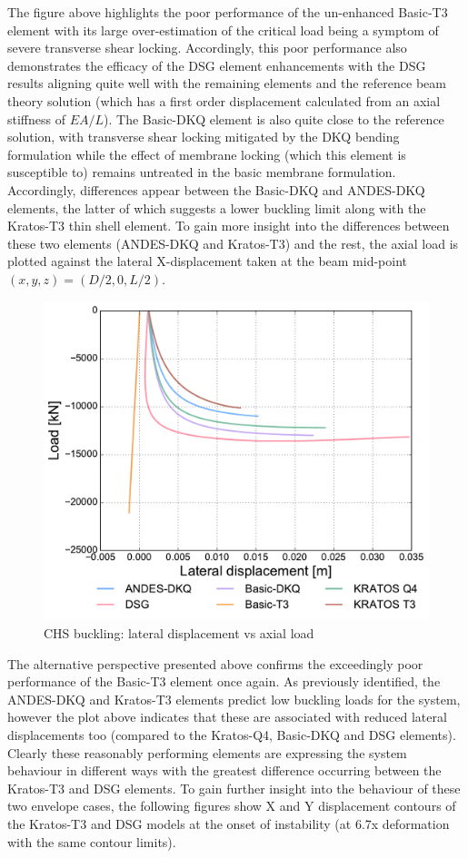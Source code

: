The figure above highlights the poor performance of the un-enhanced Basic-T3 element with its large over-estimation of the critical load being a symptom of severe transverse shear locking. Accordingly, this poor performance also demonstrates the efficacy of the DSG element enhancements with the DSG results aligning quite well with the remaining elements and the reference beam theory solution (which has a first order displacement calculated from an axial stiffness of $EA/L$). The Basic-DKQ element is also quite close to the reference solution, with transverse shear locking mitigated by the DKQ bending formulation while the effect of membrane locking (which this element is susceptible to) remains untreated in the basic membrane formulation. Accordingly, differences appear between the Basic-DKQ and ANDES-DKQ elements, the latter of which suggests a lower buckling limit along with the Kratos-T3 thin shell element. To gain more insight into the differences between these two elements (ANDES-DKQ and Kratos-T3) and the rest, the axial load is plotted against the lateral X-displacement taken at the beam mid-point $(x,y,z) = (D/2,0,L/2)$.

\begin{figure}[H]
	\centering
	\def\svgwidth{\columnwidth}
	\includegraphics[width=12cm]{images/stability_chs_trans_disp.pdf}
	\caption{CHS buckling: lateral displacement vs axial load}
	\label{pic:eulerchs2}
\end{figure}

The alternative perspective presented above confirms the exceedingly poor performance of the Basic-T3 element once again. As previously identified, the ANDES-DKQ and Kratos-T3 elements predict low buckling loads for the system, however the plot above indicates that these are associated with reduced lateral displacements too (compared to the Kratos-Q4, Basic-DKQ and DSG elements). Clearly these reasonably performing elements are expressing the system behaviour in different ways with the greatest difference occurring between the Kratos-T3 and DSG elements. To gain further insight into the behaviour of these two envelope cases, the following figures show X and Y displacement contours of the Kratos-T3 and DSG models at the onset of instability (at 6.7x deformation with the same contour limits).

